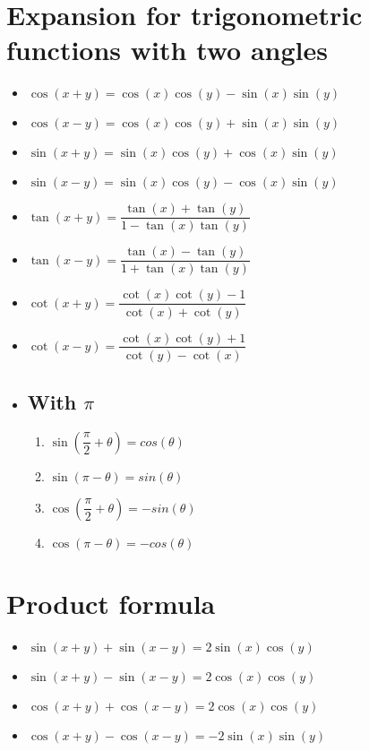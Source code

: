 \documentclass{article}
\begin{document}
\maketitle
\section{Expansion for trigonometric functions with two angles}

\begin{itemize}
\item $\cos(x+y)=\cos(x)\cos(y)-\sin(x)\sin(y)$
\item $\cos(x-y)=\cos(x)\cos(y)+\sin(x)\sin(y)$
\item $\sin(x+y)=\sin(x)\cos(y)+\cos(x)\sin(y)$
\item $\sin(x-y)=\sin(x)\cos(y)-\cos(x)\sin(y)$
\item $\tan(x+y)=\dfrac{\tan(x)+\tan(y)}{1-\tan(x)\tan(y)}$
\item $\tan(x-y)=\dfrac{\tan(x)-\tan(y)}{1+\tan(x)\tan(y)}$
\item $\cot(x+y)=\dfrac{\cot(x)\cot(y)-1}{\cot(x)+\cot(y)}$
\item $\cot(x-y)=\dfrac{\cot(x)\cot(y)+1}{\cot(y)-\cot(x)}$
\item \subsection*{With $\pi$}
\begin{enumerate}
  \item $\sin(\dfrac{\pi}{2} + \theta) = cos(\theta)$
  \item $\sin(\pi - \theta) = sin(\theta)$
  \item $\cos(\dfrac{\pi}{2} + \theta) = -sin(\theta)$
  \item $\cos(\pi - \theta) = -cos(\theta)$
\end{enumerate}
\end{itemize}

\maketitle
\section {Product formula}
\begin{itemize}
  \item $\sin(x + y) + \sin(x - y) = 2\sin(x)\cos(y)$
  \item $\sin(x + y) - \sin(x - y) = 2\cos(x)\cos(y)$
  \item $\cos(x + y) + \cos(x - y) = 2\cos(x)\cos(y)$
  \item $\cos(x + y) - \cos(x - y) = -2\sin(x)\sin(y)$
\end{itemize}
\end{document}
